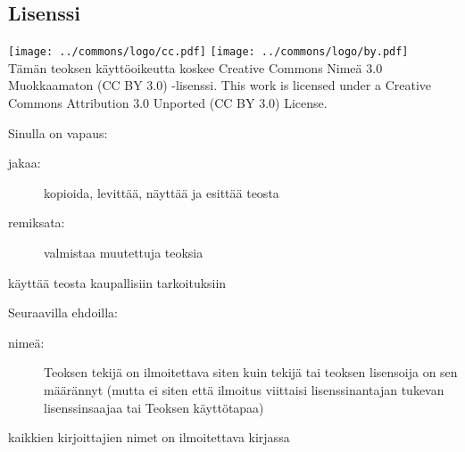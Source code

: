 \subsection*{Lisenssi}

\texttt{[image: ../commons/logo/cc.pdf]} \texttt{[image: ../commons/logo/by.pdf]} \\

Tämän teoksen käyttöoikeutta koskee Creative Commons Nimeä 3.0 Muokkaamaton (CC BY 3.0) -lisenssi.
This work is licensed under a Creative Commons Attribution 3.0 Unported (CC BY 3.0) License.


Sinulla on vapaus:
\begin{description}
\item[jakaa:] kopioida, levittää, näyttää ja esittää teosta
\item[remiksata:] valmistaa muutettuja teoksia
\item[käyttää teosta kaupallisiin tarkoituksiin]
\end{description}
Seuraavilla ehdoilla:
\begin{description}
\item[nimeä:] Teoksen tekijä on ilmoitettava siten kuin tekijä tai teoksen lisensoija on sen määrännyt (mutta ei siten että ilmoitus viittaisi lisenssinantajan tukevan lisenssinsaajaa tai Teoksen käyttötapaa)
\item[kaikkien kirjoittajien nimet on ilmoitettava kirjassa]
\end{description}

